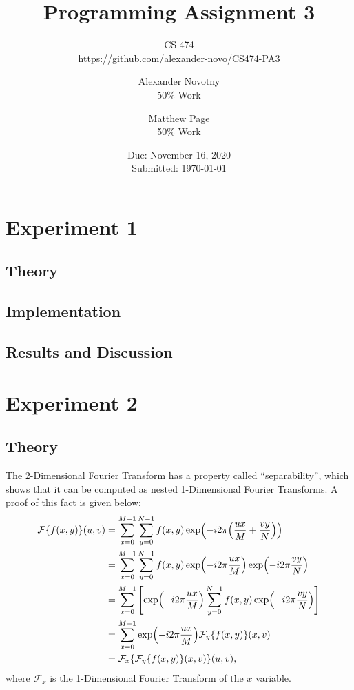 \documentclass[headings=optiontoheadandtoc,listof=totoc,parskip=full]{scrartcl}
\title{Programming Assignment 3}
\subtitle{CS 474\\\url{https://github.com/alexander-novo/CS474-PA3}}
\author{Alexander Novotny\\50\% Work \and Matthew Page\\50\% Work}
\date{Due: November 16, 2020 \\ Submitted: \today}
\begin{document}
\maketitle
\tableofcontents
{}

\newpage
{}

\section{Experiment 1}
\label{sec:exp-1}

\subsection{Theory}


\subsection{Implementation}


\subsection{Results and Discussion}


\section{Experiment 2}
\label{sec:exp-2}

\subsection{Theory}
The 2-Dimensional Fourier Transform has a property called ``separability'', which shows that it can be computed as nested 1-Dimensional Fourier Transforms. A proof of this fact is given below:
\begin{equation}
\label{eq:separability}
\begin{aligned}
	\mathcal{F}\{f(x,y)\}(u,v) &= \sum_{x = 0}^{M - 1} \sum_{y = 0}^{N - 1} f(x,y) \exp(-i2\pi\qty(\frac{ux}{M} + \frac{vy}{N}))\\
		&= \sum_{x = 0}^{M - 1} \sum_{y = 0}^{N - 1} f(x,y) \exp(-i2\pi\frac{ux}{M})\exp(-i2\pi\frac{vy}{N})\\
		&= \sum_{x = 0}^{M - 1} \qty[\exp(-i2\pi\frac{ux}{M}) \sum_{y = 0}^{N - 1} f(x,y) \exp(-i2\pi\frac{vy}{N})]\\
		&= \sum_{x = 0}^{M - 1} \exp(-i2\pi\frac{ux}{M}) \mathcal{F}_y\{f(x,y)\}(x,v)\\
		&= \mathcal{F}_x\{\mathcal{F}_y\{f(x,y)\}(x,v)\}(u,v),
\end{aligned}
\end{equation}
where $\mathcal{F}_x$ is the 1-Dimensional Fourier Transform of the $x$ variable.
\end{document}
